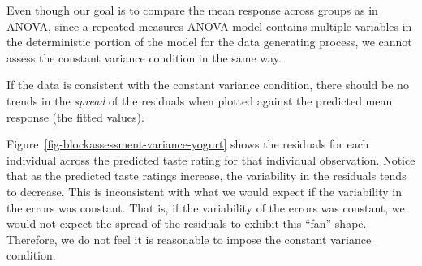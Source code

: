 \documentclass[
  letterpaper,
  DIV=11,
  numbers=noendperiod]{scrreprt}
\theoremstyle{plain}
\theoremstyle{definition}
\theoremstyle{definition}
\theoremstyle{remark}
\begin{document}
\begin{tcolorbox}[enhanced jigsaw, breakable, titlerule=0mm, colframe=quarto-callout-warning-color-frame, bottomtitle=1mm, opacityback=0, rightrule=.15mm, toptitle=1mm, arc=.35mm, bottomrule=.15mm, left=2mm, title=\textcolor{quarto-callout-warning-color}{\faExclamationTriangle}\hspace{0.5em}{Warning}, leftrule=.75mm, coltitle=black, toprule=.15mm, colbacktitle=quarto-callout-warning-color!10!white, colback=white, opacitybacktitle=0.6]

Even though our goal is to compare the mean response across groups as in
ANOVA, since a repeated measures ANOVA model contains multiple variables
in the deterministic portion of the model for the data generating
process, we cannot assess the constant variance condition in the same
way.

\end{tcolorbox}

\begin{tcolorbox}[enhanced jigsaw, breakable, titlerule=0mm, colframe=quarto-callout-note-color-frame, bottomtitle=1mm, opacityback=0, rightrule=.15mm, toptitle=1mm, arc=.35mm, bottomrule=.15mm, left=2mm, title=\textcolor{quarto-callout-note-color}{\faInfo}\hspace{0.5em}{Graphically Assessing the Constant Variance Condition}, leftrule=.75mm, coltitle=black, toprule=.15mm, colbacktitle=quarto-callout-note-color!10!white, colback=white, opacitybacktitle=0.6]

If the data is consistent with the constant variance condition, there
should be no trends in the \emph{spread} of the residuals when plotted
against the predicted mean response (the fitted values).

\end{tcolorbox}

Figure~\ref{fig-blockassessment-variance-yogurt} shows the residuals for
each individual across the predicted taste rating for that individual
observation. Notice that as the predicted taste ratings increase, the
variability in the residuals tends to decrease. This is inconsistent
with what we would expect if the variability in the errors was constant.
That is, if the variability of the errors was constant, we would not
expect the spread of the residuals to exhibit this ``fan'' shape.
Therefore, we do not feel it is reasonable to impose the constant
variance condition.
\end{document}
